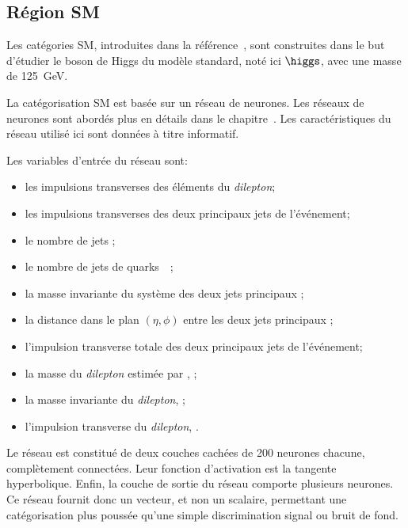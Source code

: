 \subsection{Région \og SM \fg{}}\label{chapter-HTT_analysis-section-categorisation-SM}
Les catégories SM, introduites dans la référence~\cite{CMS-PAS-HIG-19-010}, sont construites dans le but d'étudier le boson de Higgs du modèle standard, noté ici $\higgs$, avec une masse de \SI{125}{\GeV}.
\par %
La catégorisation SM est basée sur un réseau de neurones.
Les réseaux de neurones sont abordés plus en détails dans le chapitre~.
Les caractéristiques du réseau utilisé ici sont données à titre informatif.
\par
Les variables d'entrée du réseau sont:
\begin{itemize}
\item les impulsions transverses des éléments du \emph{dilepton};
\item les impulsions transverses des deux principaux jets de l'événement;
\item le nombre de jets \Njets;
\item le nombre de jets de quarks~\quarkb\ \Nbjets;
\item la masse invariante du système des deux jets principaux \mjj;
\item la distance dans le plan $(\eta,\phi)$ entre les deux jets principaux \Detajj;
\item l'impulsion transverse totale des deux principaux jets de l'événement;
\item la masse du \emph{dilepton} estimée par \SVFIT, \msv;
\item la masse invariante du \emph{dilepton}, \mvis;
\item l'impulsion transverse du \emph{dilepton}, \pTvis.
\end{itemize}
\par
Le réseau est constitué de deux couches cachées de 200 neurones chacune, complètement connectées.
Leur fonction d'activation est la tangente hyperbolique.
Enfin, la couche de sortie du réseau comporte plusieurs neurones.
Ce réseau fournit donc un vecteur, et non un scalaire, permettant une catégorisation plus poussée qu'une simple discrimination signal ou bruit de fond.

